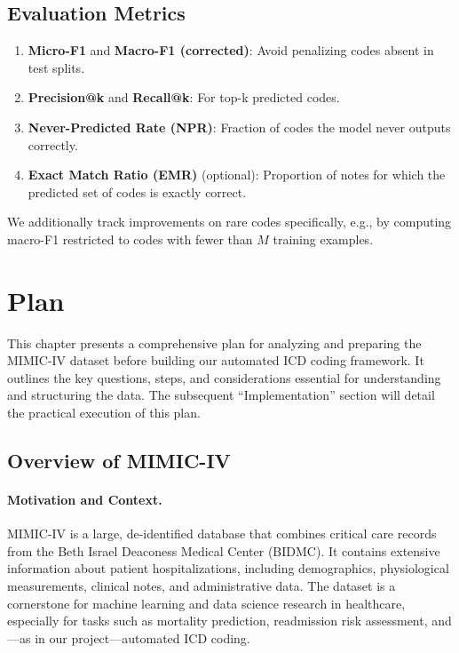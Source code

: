 \documentclass[12pt,a4paper]{report}
\begin{document}
\subsection{Evaluation Metrics}
\begin{enumerate}
    \item \textbf{Micro-F1} and \textbf{Macro-F1 (corrected)}: Avoid penalizing codes absent in test splits.
    \item \textbf{Precision@k} and \textbf{Recall@k}: For top-k predicted codes.
    \item \textbf{Never-Predicted Rate (NPR)}: Fraction of codes the model never outputs correctly.
    \item \textbf{Exact Match Ratio (EMR)} (optional): Proportion of notes for which the predicted set of codes is exactly correct.
\end{enumerate}
We additionally track improvements on rare codes specifically, e.g., by computing macro-F1 restricted to codes with fewer than $M$ training examples.




\section{Plan}

This chapter presents a comprehensive plan for analyzing and preparing the MIMIC-IV dataset before building our automated ICD coding framework. It outlines the key questions, steps, and considerations essential for understanding and structuring the data. The subsequent “Implementation” section will detail the practical execution of this plan.

\subsection{Overview of MIMIC-IV}

\paragraph{Motivation and Context.}
MIMIC-IV is a large, de-identified database that combines critical care records from the Beth Israel Deaconess Medical Center (BIDMC). It contains extensive information about patient hospitalizations, including demographics, physiological measurements, clinical notes, and administrative data. The dataset is a cornerstone for machine learning and data science research in healthcare, especially for tasks such as mortality prediction, readmission risk assessment, and—as in our project—automated ICD coding.
\end{document}
